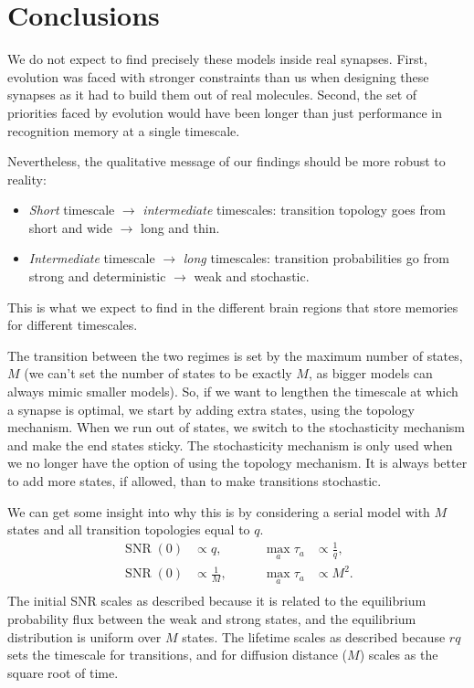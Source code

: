\documentclass[12pt]{article}
\DeclareMathOperator{\snr}{SNR}
\begin{document}
\section{Conclusions}\label{sec:conclusions}


We do not expect to find precisely these models inside real synapses.
First, evolution was faced with stronger constraints than us when designing these synapses as it had to build them out of real molecules.
Second, the set of priorities faced by evolution would have been longer than just performance in recognition memory at a single timescale.

Nevertheless, the qualitative message of our findings should be more robust to reality:
%
\begin{itemize}
  \item \emph{Short} timescale $\to$ \emph{intermediate} timescales: transition topology goes from \\ short and wide $\to$ long and thin.
  \item \emph{Intermediate} timescale $\to$ \emph{long} timescales: transition probabilities go from \\ strong and deterministic $\to$ weak and stochastic.
\end{itemize}
%
This is what we expect to find in the different brain regions that store memories for different timescales.

The transition between the two regimes is set by the maximum number of states, $M$ (we can't set the number of states to be exactly $M$, as bigger models can always mimic smaller models).
So, if we want to lengthen the timescale at which a synapse is optimal, we start by adding extra states, using the topology mechanism.
When we run out of states, we switch to the stochasticity mechanism and make the end states sticky.
The stochasticity mechanism is only used when we no longer have the option of using the topology mechanism.
It is always better to add more states, if allowed, than to make transitions stochastic.

We can get some insight into why this is by considering a serial model with $M$ states and all transition topologies equal to $q$.
%
\begin{equation*}
\begin{aligned}
  \snr(0) &\propto q,
  &\qquad
  \max_a \tau_a &\propto \frac{1}{q}, \\
  \snr(0) &\propto \frac{1}{M},
  &\qquad
  \max_a \tau_a &\propto M^2. \\
\end{aligned}
\end{equation*}
%
The initial SNR scales as described because it is related to the equilibrium probability flux between the weak and strong states, and the equilibrium distribution is uniform over $M$ states.
The lifetime scales as described because $rq$ sets the timescale for transitions, and for diffusion distance ($M$) scales as the square root of time.
\end{document}
